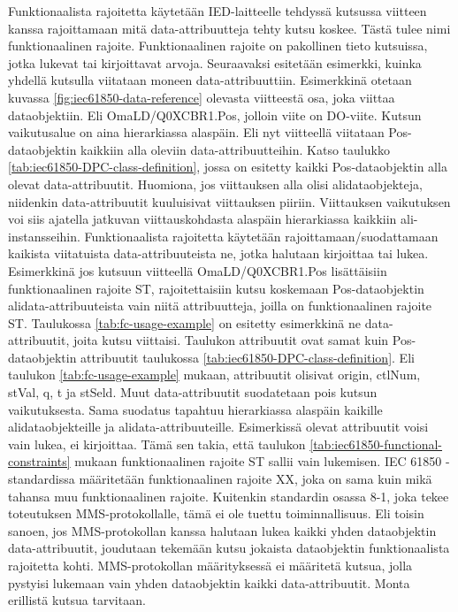Funktionaalista rajoitetta käytetään IED-laitteelle tehdyssä kutsussa viitteen kanssa rajoittamaan mitä data-attribuutteja tehty kutsu koskee. Tästä tulee nimi funktionaalinen rajoite. Funktionaalinen rajoite on pakollinen tieto kutsuissa, jotka lukevat tai kirjoittavat arvoja. Seuraavaksi esitetään esimerkki, kuinka yhdellä kutsulla viitataan moneen data-attribuuttiin. Esimerkkinä otetaan kuvassa \ref{fig:iec61850-data-reference} olevasta viitteestä osa, joka viittaa dataobjektiin. Eli OmaLD/Q0XCBR1.Pos, jolloin viite on DO-viite. Kutsun vaikutusalue on aina hierarkiassa alaspäin. Eli nyt viitteellä viitataan Pos-dataobjektin kaikkiin alla oleviin data-attribuutteihin. Katso taulukko \ref{tab:iec61850-DPC-class-definition}, jossa on esitetty kaikki Pos-dataobjektin alla olevat data-attribuutit. Huomiona, jos viittauksen alla olisi alidataobjekteja, niidenkin data-attribuutit kuuluisivat viittauksen piiriin. Viittauksen vaikutuksen voi siis ajatella jatkuvan viittauskohdasta alaspäin hierarkiassa kaikkiin ali-instansseihin. Funktionaalista rajoitetta käytetään rajoittamaan/suodattamaan kaikista viitatuista data-attribuuteista ne, jotka halutaan kirjoittaa tai lukea. Esimerkkinä jos kutsuun viitteellä OmaLD/Q0XCBR1.Pos lisättäisiin funktionaalinen rajoite ST, rajoitettaisiin kutsu koskemaan Pos-dataobjektin alidata-attribuuteista vain niitä attribuutteja, joilla on funktionaalinen rajoite ST. Taulukossa \ref{tab:fc-usage-example} on esitetty esimerkkinä ne data-attribuutit, joita kutsu viittaisi. Taulukon attribuutit ovat samat kuin Pos-dataobjektin attribuutit taulukossa \ref{tab:iec61850-DPC-class-definition}. Eli taulukon \ref{tab:fc-usage-example} mukaan, attribuutit olisivat origin, ctlNum, stVal, q, t ja stSeld. Muut data-attribuutit suodatetaan pois kutsun vaikutuksesta. Sama suodatus tapahtuu hierarkiassa alaspäin kaikille alidataobjekteille ja alidata-attribuuteille. Esimerkissä olevat attribuutit voisi vain lukea, ei kirjoittaa. Tämä sen takia, että taulukon \ref{tab:iec61850-functional-constraints} mukaan funktionaalinen rajoite ST sallii vain lukemisen. IEC 61850 -standardissa määritetään funktionaalinen rajoite XX, joka on sama kuin mikä tahansa muu funktionaalinen rajoite. Kuitenkin standardin osassa 8-1, joka tekee toteutuksen MMS-protokollalle, tämä ei ole tuettu toiminnallisuus. Eli toisin sanoen, jos MMS-protokollan kanssa halutaan lukea kaikki yhden dataobjektin data-attribuutit, joudutaan tekemään kutsu jokaista dataobjektin funktionaalista rajoitetta kohti. MMS-protokollan määrityksessä ei määritetä kutsua, jolla pystyisi lukemaan vain yhden dataobjektin kaikki data-attribuutit. Monta erillistä kutsua tarvitaan. \mbox{\cite{IEC61850-7-2}}

